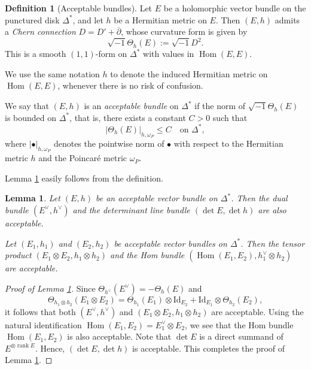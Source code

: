 \documentclass[12pt,twoside]{amsart}
\DeclareMathOperator{\rank}{rank}
\DeclareMathOperator{\Hom}{Hom}
\newtheorem{lem}[thm]{Lemma}
\theoremstyle{definition}
\newtheorem{defn}[thm]{Definition}
\begin{document}
\begin{defn}[Acceptable bundles]\label{p-def2.1}
Let $E$ be a holomorphic vector bundle on the punctured disk $\Delta^*$, and let $h$ be a Hermitian metric on $E$.  
Then $(E, h)$ admits a {\em Chern connection} $D = D' + \overline{\partial}$, whose curvature form is given by  
\[
\sqrt{-1}\Theta_h(E) := \sqrt{-1} D^2.  
\]
This is a smooth $(1,1)$-form on $\Delta^*$ with values in $\Hom(E, E)$. 

We use the same notation $h$ 
to denote the induced Hermitian metric on 
$\Hom(E, E)$, whenever there is no risk of confusion.

We say that $(E, h)$ is an \emph{acceptable bundle} 
on $\Delta^*$ if the norm of $\sqrt{-1} \Theta_h(E)$ is bounded on $\Delta^*$, 
that is, there exists a constant $C > 0$ such that
\[
|\Theta_h(E)|_{h, \omega_P} \leq C \quad \text{on } \Delta^*,
\]
where $|\bullet|_{h, \omega_P}$ denotes the pointwise 
norm of $\bullet$ with respect to the Hermitian metric 
$h$ and the Poincar\'e metric $\omega_P$.
\end{defn}

Lemma \ref{p-lem2.2} easily follows from the definition. 

\begin{lem}\label{p-lem2.2}
Let $(E, h)$ be an acceptable vector bundle on $\Delta^*$. 
Then the dual bundle $(E^\vee, h^\vee)$ and the 
determinant line bundle $(\det E, \det h)$ are also acceptable. 

Let $(E_1, h_1)$ and $(E_2, h_2)$ be acceptable 
vector bundles on $\Delta^*$. 
Then the tensor product $(E_1 \otimes E_2, h_1 \otimes h_2)$ 
and the Hom bundle $(\Hom(E_1, E_2), h_1^\vee \otimes h_2)$ are acceptable. 
\end{lem}

\begin{proof}[Proof of Lemma \ref{p-lem2.2}]
Since $\Theta_{h^\vee}(E^\vee) = -\Theta_h(E)$ and 
\[
\Theta_{h_1 \otimes h_2}(E_1 \otimes E_2) 
= \Theta_{h_1}(E_1) \otimes \mathrm{Id}_{E_2} + 
\mathrm{Id}_{E_1} \otimes \Theta_{h_2}(E_2),
\]
it follows that both $(E^\vee, h^\vee)$ and 
$(E_1 \otimes E_2, h_1 \otimes h_2)$ are acceptable. 
Using the natural identification $\Hom(E_1, E_2) = E_1^\vee \otimes E_2$, 
we see that the Hom bundle $\Hom(E_1, E_2)$ 
is also acceptable. 
Note that $\det E$ is a direct summand of $E^{\otimes \rank E}$. 
Hence, $(\det E, \det h)$ is acceptable. 
This completes the proof of Lemma \ref{p-lem2.2}.
\end{proof}
\end{document}
